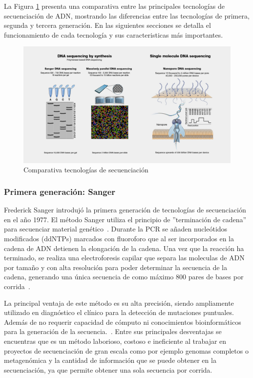 La Figura   \ref{fig:DNA_sequencing} presenta una comparativa entre las principales tecnologías de secuenciación de ADN, mostrando las diferencias entre las tecnologías de primera, segunda y tercera generación. En las siguientes secciones se detalla el funcionamiento de cada tecnología y sus caracteristicas más importantes.
\begin{figure}[H]
    \centering
    \includegraphics[width=1\linewidth]{images/DNA-Sequencing.jpg}
    \caption{Comparativa tecnologías de secuenciación}
    \label{fig:DNA_sequencing}
\end{figure}

\subsubsection{Primera generación: Sanger}
Frederick Sanger introdujó la primera generación de tecnologías de secuenciación en el año 1977. El método Sanger utiliza el principio de ''terminación de cadena'' para secuenciar material genético~\cite{sanger1975rapid}. 
Durante la PCR se añaden nucleótidos modificados (ddNTPs) marcados con fluoroforo que al ser incorporados en la cadena de ADN detienen la elongación de la cadena. Una vez que la reacción ha terminado, se realiza una electroforesis capilar que separa las moleculas de ADN por tamaño y con alta resolución para poder determinar la secuencia de la cadena, generando una única secuencia de como máximo 800 pares de bases por corrida~\cite{crossley2020guidelines}.

La principal ventaja de este método es su alta precisión, siendo ampliamente utilizado en diagnóstico el clínico para la detección de mutaciones puntuales. Además de no requerir capacidad de cómputo ni conocimientos bioinformáticos para la generación de la secuencia.~\cite{BUSCAR}.  
Entre sus principales desventajas se encuentras que es un método laborioso, costoso e ineficiente al trabajar en proyectos de secuenciación de gran escala como por ejemplo genomas completos o metagenómica y la cantidad de información que se puede obtener en la secuenciación, ya que permite obtener una sola secuencia por corrida.
 
